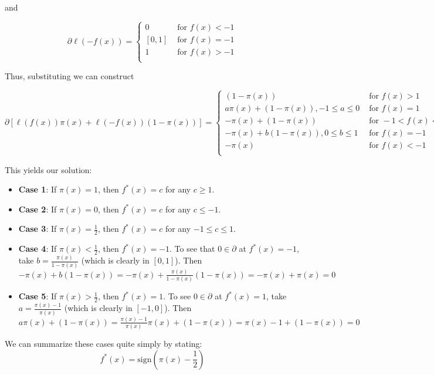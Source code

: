 \documentclass[paper=a4, fontsize=11pt]{scrartcl} %
\numberwithin{equation}{section} %
\numberwithin{figure}{section} %
\numberwithin{table}{section} %
\begin{document}
and 

\[
\partial \ell(-f(x)) =
\begin{cases}
{0} & \textrm{ for } f(x) < -1 \\
[0, 1] & \textrm{ for } f(x) = -1 \\
{1} & \textrm{ for } f(x) > -1 \\
\end{cases}
\]

Thus, substituting we can construct 

\[
\partial \left[\ell(f(x))\pi(x) + \ell(-f(x)) (1- \pi(x)) \right] =
\begin{cases}
(1 - \pi(x)) & \textrm{ for } f(x) > 1 \\
a \pi(x) + (1 - \pi(x)), -1 \leq a \leq 0 & \textrm{ for } f(x) = 1 \\
- \pi(x) + (1 - \pi(x)) & \textrm{ for } -1 < f(x) < 1 \\
- \pi(x) + b (1 - \pi(x)), 0 \leq b \leq 1 & \textrm{ for } f(x) = -1 \\
- \pi(x) & \textrm{ for } f(x) < -1 \\
\end{cases}
\]

This yields our solution:

\begin{itemize}
\item \textbf{Case 1}: If $\pi(x) = 1$, then $f^*(x) = c$ for any $c \geq 1$.
\item \textbf{Case 2}: If $\pi(x) = 0$, then $f^*(x) = c$ for any $c \leq -1$. 
\item \textbf{Case 3}: If $\pi(x) = \frac{1}{2}$, then $f^*(x) = c$ for any $-1 \leq c \leq 1$. 
\item \textbf{Case 4}: If $\pi(x) < \frac{1}{2}$, then $f^*(x) = -1$. To see that $0 \in \partial$ at $f^*(x) = -1$, take $b = \frac{\pi(x)}{1 - \pi(x)}$ (which is clearly in $[0,1]$). Then \\
$-\pi(x) + b(1 - \pi(x))  = -\pi(x) + \frac{\pi(x)}{1 - \pi(x)}(1 - \pi(x)) = -\pi(x) + \pi(x) = 0$
\item \textbf{Case 5}: If $\pi(x) > \frac{1}{2}$, then $f^*(x) = 1$. To see  $0 \in \partial$ at $f^*(x) = 1$, take $a = \frac{\pi(x) - 1}{\pi(x)}$ (which is clearly in $[-1,0]$). Then \\
$a \pi(x) + (1 - \pi(x))  = \frac{\pi(x) - 1}{\pi(x)} \pi(x) + (1 - \pi(x)) =\pi(x) - 1 + (1 - \pi(x)) = 0$
\end{itemize}

We can summarize these cases quite simply by stating:
\[f^*(x) = \textrm{sign}\left(\pi(x) - \frac{1}{2}\right)\] 
\end{document}
